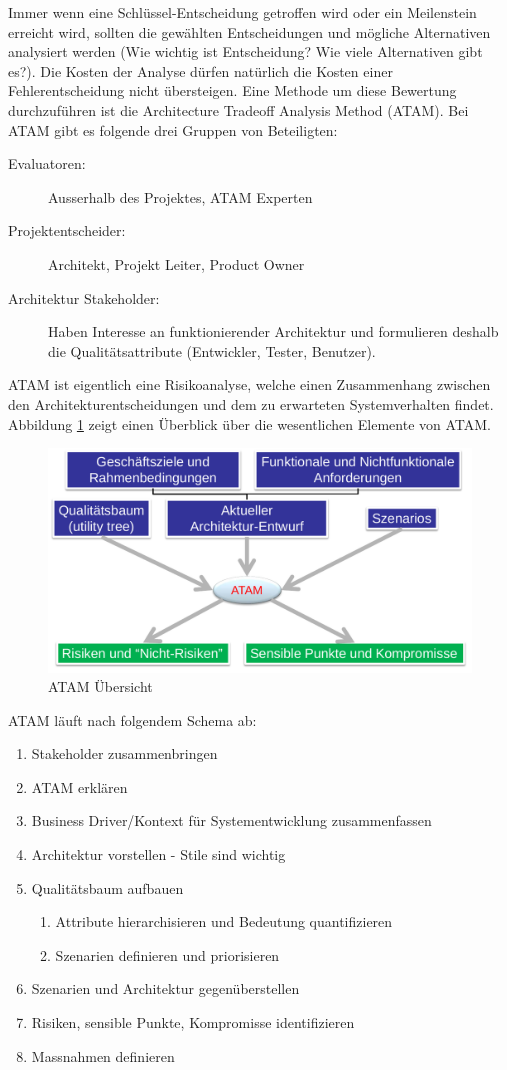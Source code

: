 Immer wenn eine Schlüssel-Entscheidung getroffen wird oder ein Meilenstein erreicht wird, sollten die gewählten Entscheidungen und mögliche Alternativen analysiert werden (Wie wichtig ist Entscheidung? Wie viele Alternativen gibt es?). Die Kosten der Analyse dürfen natürlich die Kosten einer Fehlerentscheidung nicht übersteigen. Eine Methode um diese Bewertung durchzuführen ist die Architecture Tradeoff Analysis Method (ATAM). Bei ATAM gibt es folgende drei Gruppen von Beteiligten:
\begin{description}
	\item[Evaluatoren:] Ausserhalb des Projektes, ATAM Experten
	\item[Projektentscheider:] Architekt, Projekt Leiter, Product Owner
	\item[Architektur Stakeholder:] Haben Interesse an funktionierender Architektur und formulieren deshalb die Qualitätsattribute (Entwickler, Tester, Benutzer).
\end{description}
ATAM ist eigentlich eine Risikoanalyse, welche einen Zusammenhang zwischen den Architekturentscheidungen und dem zu erwarteten Systemverhalten findet. Abbildung \ref{fig:atam} zeigt einen Überblick über die wesentlichen Elemente von ATAM.
\begin{figure}
\centering
\includegraphics[width=0.6\linewidth]{fig/atam}
\caption{ATAM Übersicht}
\label{fig:atam}
\end{figure}
ATAM läuft nach folgendem Schema ab:
\begin{enumerate}
	\item Stakeholder zusammenbringen
	\item ATAM erklären
	\item Business Driver/Kontext für Systementwicklung zusammenfassen
	\item Architektur vorstellen - Stile sind wichtig
	\item Qualitätsbaum aufbauen
	\begin{enumerate}
		\item Attribute hierarchisieren und Bedeutung quantifizieren
		\item Szenarien definieren und priorisieren
	\end{enumerate} 
	\item Szenarien und Architektur gegenüberstellen
	\item Risiken, sensible Punkte, Kompromisse identifizieren
	\item Massnahmen definieren
\end{enumerate}
